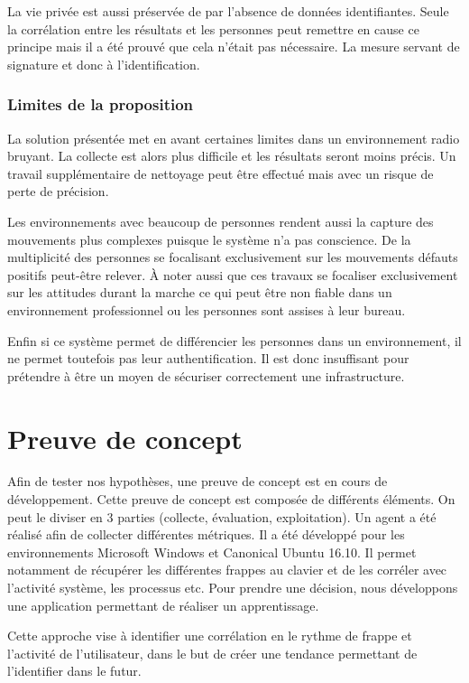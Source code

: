 \documentclass[conference,compsoc]{IEEEtran}
\begin{document}
La vie privée est aussi préservée de par l'absence de données identifiantes. Seule la corrélation entre les résultats et les personnes peut remettre en cause ce principe mais il a été prouvé que cela n'était pas nécessaire. La mesure servant de signature et donc à l'identification.

\subsubsection{Limites de la proposition}

La solution présentée met en avant certaines limites dans un environnement radio bruyant. La collecte est alors plus difficile et les résultats seront moins précis. Un travail supplémentaire de nettoyage peut être effectué mais avec un risque de perte de précision.

Les environnements avec beaucoup de personnes rendent aussi la capture des mouvements plus complexes puisque le système n'a pas conscience. De la multiplicité des personnes se focalisant exclusivement sur les mouvements défauts positifs peut-être relever. À noter aussi que ces travaux se focaliser exclusivement sur les attitudes durant la marche ce qui peut être non fiable dans un environnement professionnel ou les personnes sont assises à leur bureau.

Enfin si ce système permet de différencier les personnes dans un environnement, il ne permet toutefois pas leur authentification. Il est donc insuffisant pour prétendre à être un moyen de sécuriser correctement une infrastructure.

\section{Preuve de concept}
Afin de tester nos hypothèses, une preuve de concept est en cours de développement.
 Cette preuve de concept est composée de différents éléments. On peut le diviser en 3 parties (collecte, évaluation, exploitation). Un agent a été réalisé afin de collecter différentes métriques.
 Il a été développé pour les environnements Microsoft Windows et Canonical Ubuntu 16.10.
 Il permet notamment de récupérer les différentes frappes au clavier et de les corréler avec l'activité système, les processus etc.
 Pour prendre une décision, nous développons une application permettant de réaliser un apprentissage.

 Cette approche vise à identifier une corrélation en le rythme de frappe et l'activité de l'utilisateur, dans le but de créer une tendance permettant de l'identifier dans le futur.
\end{document}

